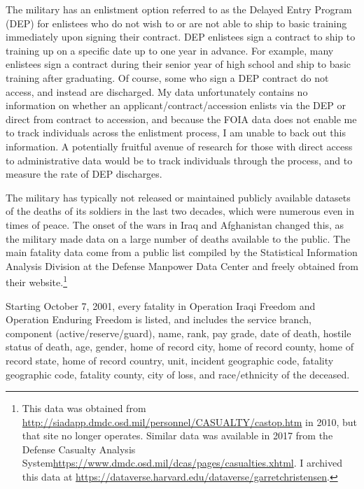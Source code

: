 \documentclass[12pt] {article}
\begin{document}
The military has an enlistment option referred to as the Delayed Entry Program (DEP) for enlistees who do not wish to or are not able to ship to basic training immediately upon signing their contract. DEP enlistees sign a contract to ship to training up on a specific date up to one year in advance. For example, many enlistees sign a contract during their senior year of high school and ship to basic training after graduating. Of course, some who sign a DEP contract do not access, and instead are discharged. My data unfortunately contains no information on whether an applicant/contract/accession enlists via the DEP or direct from contract to accession, and because the FOIA data does not enable me to track individuals across the enlistment process, I am unable to back out this information. A potentially fruitful avenue of research for those with direct access to administrative data would be to track individuals through the process, and to measure the rate of DEP discharges.

The military has typically not released or maintained publicly available
datasets of the deaths of its soldiers in the last two decades, which
were numerous even in times of peace. The onset of the wars in Iraq
and Afghanistan changed this, as the military made data on a large number of
deaths available to the public. The main fatality data come from a public list compiled by the Statistical
Information Analysis Division at the Defense Manpower Data Center
and freely obtained from their website.\footnote{This data was obtained from  \url{http://siadapp.dmdc.osd.mil/personnel/CASUALTY/castop.htm} in 2010, but that site no longer operates. Similar data was available in 2017 from the Defense Casualty Analysis System\url{https://www.dmdc.osd.mil/dcas/pages/casualties.xhtml}. I archived this data at \url{https://dataverse.harvard.edu/dataverse/garretchristensen}.}

Starting October 7, 2001, every fatality in Operation Iraqi Freedom
and Operation Enduring Freedom is listed, and includes
the service branch, component (active/reserve/guard), name, rank,
pay grade, date of death, hostile status of death, age, gender, home
of record city, home of record county, home of record state, home
of record country, unit, incident geographic code, fatality geographic
code, fatality county, city of loss, and race/ethnicity of the deceased.
\end{document}
